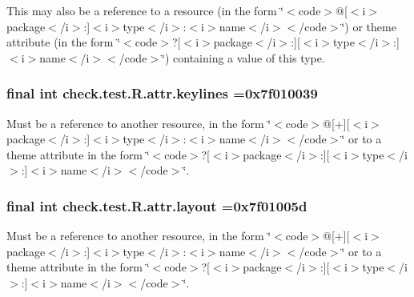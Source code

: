 This may also be a reference to a resource (in the form \char`\"{}$<$code$>$@\mbox{[}$<$i$>$package$<$/i$>$\+:\mbox{]}$<$i$>$type$<$/i$>$\+:$<$i$>$name$<$/i$>$$<$/code$>$\char`\"{}) or theme attribute (in the form \char`\"{}$<$code$>$?\mbox{[}$<$i$>$package$<$/i$>$\+:\mbox{]}\mbox{[}$<$i$>$type$<$/i$>$\+:\mbox{]}$<$i$>$name$<$/i$>$$<$/code$>$\char`\"{}) containing a value of this type. \hypertarget{classcheck_1_1test_1_1_r_1_1attr_a3ce856b9d1ee5098ec18015926299c1b}{}
\subsubsection[{keylines}]{\setlength{\rightskip}{0pt plus 5cm}final int check.\+test.\+R.\+attr.\+keylines =0x7f010039\hspace{0.3cm}{\ttfamily [static]}}\label{classcheck_1_1test_1_1_r_1_1attr_a3ce856b9d1ee5098ec18015926299c1b}
Must be a reference to another resource, in the form \char`\"{}$<$code$>$@\mbox{[}+\mbox{]}\mbox{[}$<$i$>$package$<$/i$>$\+:\mbox{]}$<$i$>$type$<$/i$>$\+:$<$i$>$name$<$/i$>$$<$/code$>$\char`\"{} or to a theme attribute in the form \char`\"{}$<$code$>$?\mbox{[}$<$i$>$package$<$/i$>$\+:\mbox{]}\mbox{[}$<$i$>$type$<$/i$>$\+:\mbox{]}$<$i$>$name$<$/i$>$$<$/code$>$\char`\"{}. \hypertarget{classcheck_1_1test_1_1_r_1_1attr_ad35b4cdae10aba976d5133cc5f47e7af}{}
\subsubsection[{layout}]{\setlength{\rightskip}{0pt plus 5cm}final int check.\+test.\+R.\+attr.\+layout =0x7f01005d\hspace{0.3cm}{\ttfamily [static]}}\label{classcheck_1_1test_1_1_r_1_1attr_ad35b4cdae10aba976d5133cc5f47e7af}
Must be a reference to another resource, in the form \char`\"{}$<$code$>$@\mbox{[}+\mbox{]}\mbox{[}$<$i$>$package$<$/i$>$\+:\mbox{]}$<$i$>$type$<$/i$>$\+:$<$i$>$name$<$/i$>$$<$/code$>$\char`\"{} or to a theme attribute in the form \char`\"{}$<$code$>$?\mbox{[}$<$i$>$package$<$/i$>$\+:\mbox{]}\mbox{[}$<$i$>$type$<$/i$>$\+:\mbox{]}$<$i$>$name$<$/i$>$$<$/code$>$\char`\"{}. \hypertarget{classcheck_1_1test_1_1_r_1_1attr_a513151f8e3655d179db3b9e843eb2099}{}
